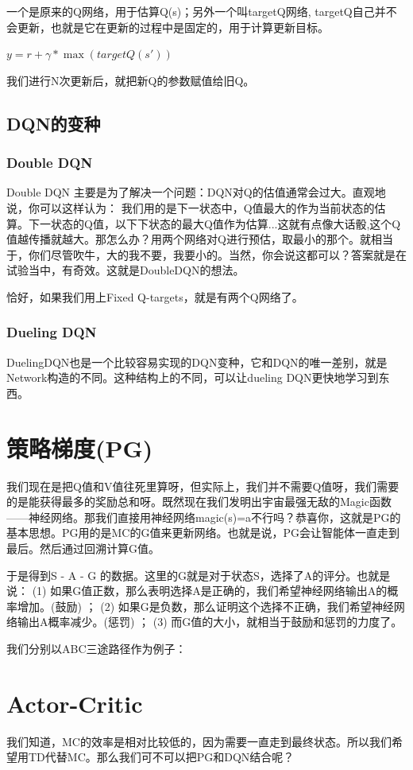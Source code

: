 \documentclass[12pt]{article}
\begin{document}
一个是原来的Q网络，用于估算Q(s)；另外一个叫targetQ网络, targetQ自己并不会更新，也就是它在更新的过程中是固定的，用于计算更新目标。

$y = r + \gamma * \max(target Q(s'))$

我们进行N次更新后，就把新Q的参数赋值给旧Q。


\subsection{DQN的变种}
\subsubsection{Double DQN}
Double DQN 主要是为了解决一个问题：DQN对Q的估值通常会过大。直观地说，你可以这样认为： 我们用的是下一状态中，Q值最大的作为当前状态的估算。下一状态的Q值，以下下状态的最大Q值作为估算...这就有点像大话骰,这个Q值越传播就越大。那怎么办？用两个网络对Q进行预估，取最小的那个。就相当于，你们尽管吹牛，大的我不要，我要小的。当然，你会说这都可以？答案就是在试验当中，有奇效。这就是DoubleDQN的想法。

恰好，如果我们用上Fixed Q-targets，就是有两个Q网络了。

\subsubsection{Dueling DQN}
DuelingDQN也是一个比较容易实现的DQN变种，它和DQN的唯一差别，就是Network构造的不同。这种结构上的不同，可以让dueling DQN更快地学习到东西。

\section{策略梯度(PG)}
我们现在是把Q值和V值往死里算呀，但实际上，我们并不需要Q值呀，我们需要的是能获得最多的奖励总和呀。既然现在我们发明出宇宙最强无敌的Magic函数——神经网络。那我们直接用神经网络magic(s)=a不行吗？恭喜你，这就是PG的基本思想。PG用的是MC的G值来更新网络。也就是说，PG会让智能体一直走到最后。然后通过回溯计算G值。

于是得到S - A - G 的数据。这里的G就是对于状态S，选择了A的评分。也就是说： (1) 如果G值正数，那么表明选择A是正确的，我们希望神经网络输出A的概率增加。(鼓励) ； (2) 如果G是负数，那么证明这个选择不正确，我们希望神经网络输出A概率减少。(惩罚) ； (3) 而G值的大小，就相当于鼓励和惩罚的力度了。

我们分别以ABC三途路径作为例子：

\section{Actor-Critic}
我们知道，MC的效率是相对比较低的，因为需要一直走到最终状态。所以我们希望用TD代替MC。那么我们可不可以把PG和DQN结合呢？
\end{document}
